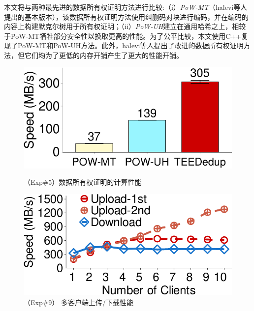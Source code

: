 本文将\sysnameS 与两种最先进的数据所有权证明方法进行比较:（i）\textit{PoW-MT}\cite{halevi11}（halevi等人提出的基本版本），该数据所有权证明方法使用纠删码对块进行编码，并在编码的内容上构建默克尔树用于所有权证明；（ii）\textit{PoW-UH}\cite{xu2013weak}建立在通用哈希之上，相较于PoW-MT牺牲部分安全性以换取更高的性能。为了公平比较，本文使用C++复现了PoW-MT和PoW-UH方法。此外，halevi等人\cite{halevi11}提出了改进的数据所有权证明方法，但它们均为了更低的内存开销产生了更大的性能开销。

\begin{figure}[!htb]
    \begin{minipage}[t]{0.47\textwidth}
        \centering
        \includegraphics[width=\linewidth]{pic/sgxdedup/expa4_powPerformance.pdf}
        \caption{\small（Exp\#5）数据所有权证明的计算性能}
        \label{fig:sgxdedup-pow-comparison}
        \end{minipage}%
    \hspace{0.2in}
    \begin{minipage}[t]{0.47\textwidth}
        \centering
        \includegraphics[width=\linewidth]{pic/sgxdedup/expb1_multiple_client.pdf}  
        \caption{（Exp\#9） 多客户端上传/下载性能}
        \label{fig:sgxdedup-multiClientThroughput}
    \end{minipage}%
\end{figure}

